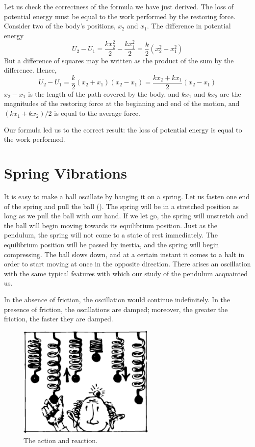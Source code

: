 Let us check the correctness of the formula we have just
derived. The loss of potential energy must be equal to the
work performed by the restoring force. Consider two of the
body's positions, $x_{2}$ and $x_{1}$. The difference in potential
energy
\begin{equation*}%
U_{2} - U_{1} = \frac{k x_{2}^{2}}{2} -  \frac{k x_{1}^{2}}{2} = \frac{k}{2} \left(x_{2}^{2} - x_{1}^{2} \right)
\end{equation*}
But a difference of squares may be written as the product of the sum by the difference. Hence,
\begin{equation*}%
U_{2} - U_{1} = \frac{k}{2} (x_{2} + x_{1})(x_{2} - x_{1}) = \frac{kx_{2}+kx_{1}}{2} (x_{2}-x_{1})
\end{equation*}
$x_{2}-x_{1}$ is the length of the path covered by the body,
and $kx_{1}$ and $kx_{2}$ are the magnitudes of the restoring force at
the beginning and end of the motion, and $(kx_{1}+kx_{2})/2$
is equal to the average force.

Our formula led us to the correct result: the loss of
potential energy is equal to the work performed.

\section{Spring Vibrations}
It is easy to make a ball oscillate by hanging it on a
spring. Let us fasten one end of the spring and pull the
ball (). The spring will be in a stretched position as long as we pull the ball with our hand. If we
let go, the spring will unstretch and the ball will begin
moving towards its equilibrium position. Just as the
pendulum, the spring will not come to a state of rest
immediately. The equilibrium position will be passed by
inertia, and the spring will begin compressing. The ball
slows down, and at a certain instant it comes to a halt in
order to start moving at once in the opposite direction.
There arises an oscillation with the same typical features
with which our study of the pendulum acquainted us.

In the absence of friction, the oscillation would continue indefinitely. In the presence of friction, the oscillations are damped; moreover, the greater the friction, the faster they are damped.

\begin{figure}[!ht]
\centering
\includegraphics[width=0.6\textwidth]{figures/fig-04-06.pdf}
\caption{The action and reaction.}
\label{fig-4.06}
\end{figure}

